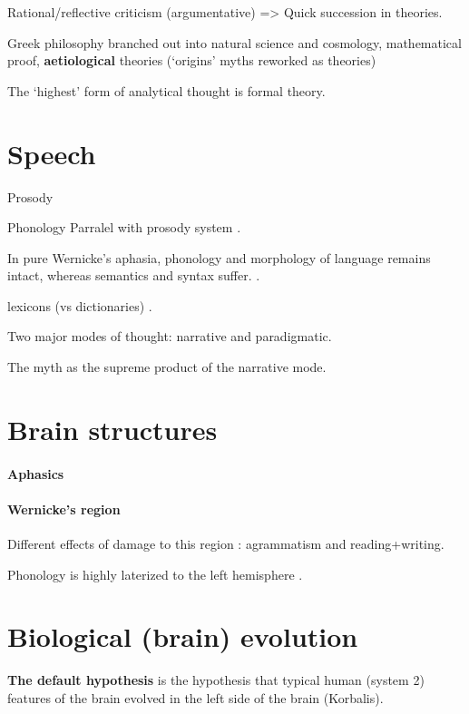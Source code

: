 \documentclass{article}
\begin{document}
Rational/reflective criticism (argumentative) => Quick succession in theories.

Greek philosophy branched out into natural science and cosmology, mathematical proof, \textbf{aetiological} theories (`origins' myths reworked as theories)

The `highest' form of analytical thought is formal theory.

\section{Speech}

Prosody

Phonology
Parralel with prosody system \citep[p.~249]{donald1991}.

In pure Wernicke's aphasia, phonology and morphology of language remains intact, whereas semantics and syntax suffer. \citep[p.~249]{donald1991}.

lexicons (vs dictionaries) \citep[fig.~7.1, p.~251]{donald1991}.

Two major modes of thought: narrative and paradigmatic.

The myth as the supreme product of the narrative mode.

\section{Brain structures}

\paragraph{Aphasics}

\paragraph{Wernicke's region}

Different effects of damage to this region \citep[p.~262]{donald1991}: agrammatism and reading+writing.

Phonology is highly laterized to the left hemisphere \citep[p.~262]{donald1991}.

\section{Biological (brain) evolution}
\label{sec:biological_evolution}

\textbf{The default hypothesis} is the hypothesis that typical human (system 2) features
of the brain evolved in the left side of the brain (Korbalis).
\end{document}

